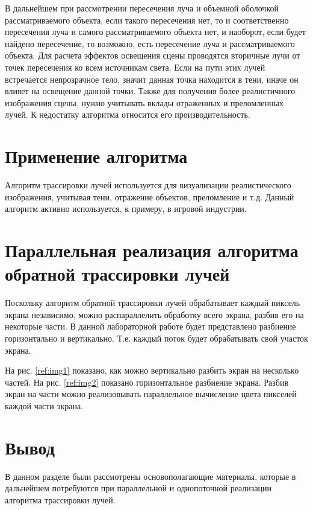 \begin{figure}[ht!]
\end{figure}

В дальнейшем при рассмотрении пересечения луча и объемной оболочкой
рассматриваемого объекта, если такого пересечения нет, то и соответственно пере­сечения
луча и самого рассматриваемого объекта нет, и наоборот, если будет найдено
пересечение, то возможно, есть пересечение луча и рассматриваемого объекта. Для
расчета эффектов освещения сцены проводятся вторичные лучи от точек пересече­ния
ко всем источникам света. Если на пути этих лучей встречается непрозрачное
тело, значит данная точка находится в тени, иначе он влияет на освещение данной
точки. Также для получения более реалистичного изображения сцены, нужно учи­тывать
вклады отраженных и преломленных лучей.
К недостатку алгоритма относится его производительность.

\section{Применение алгоритма}

Алгоритм трассировки лучей используется для визуализации
реалистического изображения, учитывая тени, отражение объектов, преломление и т.д.
Данный алгоритм активно используется, к примеру, в игровой индустрии.

\section{Параллельная реализация алгоритма обратной трассировки лучей}

Поскольку алгоритм обратной трассировки лучей обрабатывает каждый пиксель
экрана независимо, можно распараллелить обработку всего экрана, разбив
его на некоторые части. В данной лабораторной работе будет представлено
разбиение горизонтально и вертикально. Т.е. каждый поток будет обрабатывать
свой участок экрана.

На рис. \ref{ref:img1} показано, как можно вертикально разбить экран на
несколько частей. На рис. \ref{ref:img2} показано горизонтальное разбиение экрана.
Разбив экран на части можно реализовывать параллельное вычисление цвета
пикселей каждой части экрана.

\begin{figure}[ht!]
\end{figure}

\begin{figure}[ht!]
\end{figure}

\section{Вывод}

В данном разделе были рассмотрены
основополагающие материалы, которые в дальнейшем потребуются
при параллельной и однопоточной реализации алгоритма трассировки лучей.
